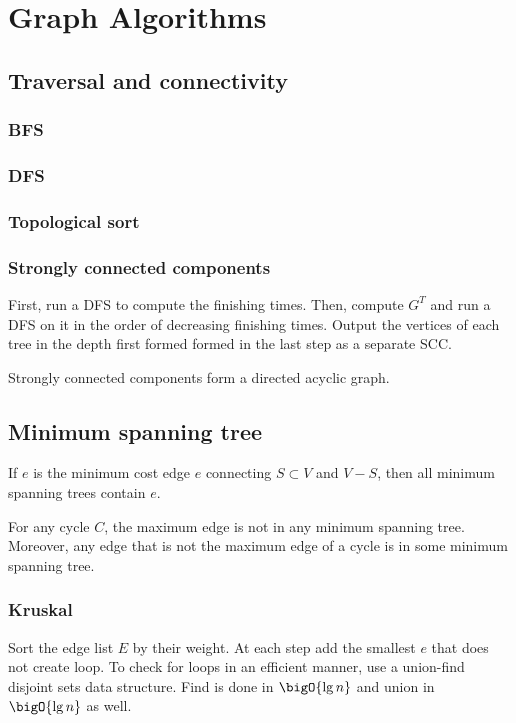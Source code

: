 \chapter{Graph Algorithms}
\section*{Traversal and connectivity}
\subsection*{BFS}
\subsection*{DFS}
\subsection*{Topological sort}
\subsection*{Strongly connected components}
First, run a DFS to compute the finishing times. Then, compute \(G^T\) and run a DFS on it in the order of decreasing finishing times. Output the vertices of each tree in the depth first formed formed in the last step as a separate SCC.
\begin{corollary}
    Strongly connected components form a directed acyclic graph.
\end{corollary}
\section*{Minimum spanning tree}
\begin{lemma}
    If \(e\) is the minimum cost edge \(e\) connecting \(S \subset V\) and \(V- S\), then all minimum spanning trees contain \(e\).
\end{lemma}

\begin{lemma}
    For any cycle \(C\), the maximum edge is not in any minimum spanning tree. Moreover, any edge that is not the maximum edge of a cycle is in some minimum spanning tree.
\end{lemma}

\subsection*{Kruskal}
Sort the edge list \(E\) by their weight. At each step add the smallest \(e\) that does not create loop. To check for loops in an efficient manner, use a union-find disjoint sets data structure. Find is done in \(\bigO{\lg n}\) and union in \(\bigO{\lg n}\) as well.
